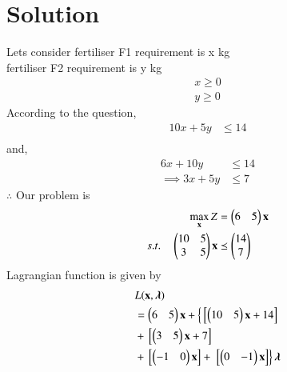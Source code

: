 \documentclass[journal,12pt,twocolumn]{IEEEtran}
\begin{document}
\section{Solution}
\begin{table}[!ht]
\centering
{}
\label{opt/16/tab:table1}
\end{table}
\item Lets consider fertiliser F1 requirement is x kg \\
fertiliser F2 requirement is y kg 
\begin{align}
    x \geq 0 \\
    y \geq 0 
\end{align}
According to the question,
\begin{align}
    10x+5y &\leq 14 \\
\end{align}
     and,
\begin{align}
    6x+10y &\leq 14 \\
 \implies 3x+5y &\leq 7
\end{align}
$\therefore$ Our problem is
\begin{align}
        \max_{\mathbf{x}} Z &= \begin{pmatrix}6 & 5\end{pmatrix}\mathbf{x}\\
        s.t. \quad 
        \begin{pmatrix}10 & 5 \\ 3 & 5 \end{pmatrix}\mathbf{x} &\preceq \begin{pmatrix}14\\7\end{pmatrix} 
\end{align}
Lagrangian function is given by
\begin{equation}
\begin{aligned}
    &L(\mathbf{x},\boldsymbol{\lambda}) \\ &= \begin{pmatrix}6 & 5\end{pmatrix}\mathbf{x}+\left\{{}\left[\begin{pmatrix}10 & 5\end{pmatrix}\mathbf{x}+14\right]\right. \\ &+ {}\left[\begin{pmatrix}3 & 5\end{pmatrix}\mathbf{x}+7\right] \\ &+ {}\left[\begin{pmatrix}-1 & 0\end{pmatrix}\mathbf{x}\right] +\left.{}\left[\begin{pmatrix}0 & -1\end{pmatrix}\mathbf{x}\right]\right\}\boldsymbol{\lambda}
\end{aligned}
\end{equation}
\end{document}
